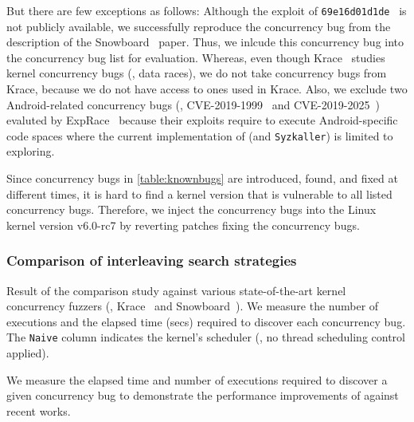 But there are few exceptions as follows: Although the exploit of
\texttt{69e16d01d1de}~\cite{snowboardbug} is not publicly available,
we successfully reproduce the concurrency bug from the description of
the Snowboard~\cite{snowboard} paper. Thus, we inlcude this
concurrency bug into the concurrency bug list for evaluation.
%
Whereas, even though Krace~\cite{krace} studies kernel concurrency
bugs (\ie, data races), we do not take concurrency bugs from Krace,
because we do not have access to ones used in Krace.
%
Also, we exclude two Android-related concurrency bugs (\ie,
CVE-2019-1999~\cite{cve20191999} and CVE-2019-2025~\cite{cve20192025})
evaluted by ExpRace~\cite{exprace} because their exploits require to
execute Android-specific code spaces where the current implementation
of \sys (and \texttt{Syzkaller}) is limited to exploring.



%
Since concurrency bugs in \autoref{table:knownbugs} are introduced,
found, and fixed at different times, it is hard to find a kernel
version that is vulnerable to all listed concurrency bugs.
%
Therefore, we inject the concurrency bugs into the Linux kernel
version v6.0-rc7 by reverting patches fixing the concurrency bugs.






\subsubsection{Comparison of interleaving search strategies}
\label{sss:interleavingsearch}
%
%
\begin{table}
  \centering
  
  \caption{Result of the comparison study against various
    state-of-the-art kernel concurrency fuzzers (\ie,
    Krace~\cite{krace} and Snowboard~\cite{snowboard}). We measure the
    number of executions and the elapsed time (secs) required to
    discover each concurrency bug. The \texttt{Naive} column indicates
    the kernel's scheduler (\ie, no thread scheduling control applied).}
  \label{table:comparison-interleaving-search}
\end{table}
%
We measure the elapsed time and number of executions required to
discover a given concurrency bug to demonstrate the performance
improvements of \sys against recent works.

